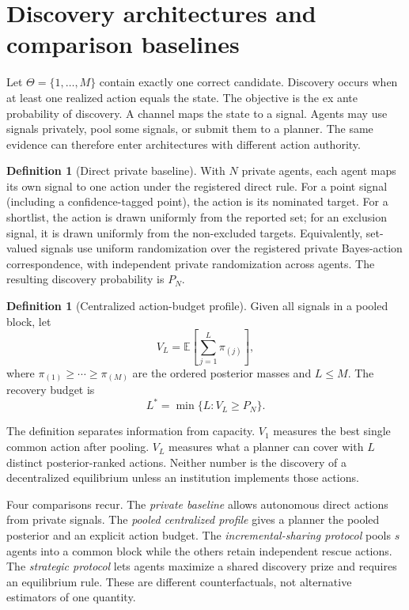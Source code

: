 \documentclass[12pt]{article}
\newcommand{\E}{\mathbb{E}}
\theoremstyle{definition}
\newtheorem{definition}[theorem]{Definition}
\begin{document}
\section{Discovery architectures and comparison baselines}

Let $\Theta=\{1,\ldots,M\}$ contain exactly one correct candidate. Discovery
occurs when at least one realized action equals the state. The objective is the
ex ante probability of discovery. A channel maps the state to a signal. Agents
may use signals privately, pool some signals, or submit them to a planner. The
same evidence can therefore enter architectures with different action authority.

\begin{definition}[Direct private baseline]
With $N$ private agents, each agent maps its own signal to one action under the
registered direct rule. For a point signal (including a confidence-tagged
point), the action is its nominated target. For a shortlist, the action is drawn
uniformly from the reported set; for an exclusion signal, it is drawn uniformly
from the non-excluded targets. Equivalently, set-valued signals use uniform
randomization over the registered private Bayes-action correspondence, with
independent private randomization across agents. The resulting discovery
probability is $P_N$.
\end{definition}

\begin{definition}[Centralized action-budget profile]
Given all signals in a pooled block, let
\[
 V_L=\E\left[\sum_{j=1}^{L}\pi_{(j)}\right],
\]
where $\pi_{(1)}\geq\cdots\geq\pi_{(M)}$ are the ordered posterior masses and
$L\leq M$. The recovery budget is
\[
 L^*=\min\{L:V_L\geq P_N\}.
\]
\end{definition}

The definition separates information from capacity. $V_1$ measures the best
single common action after pooling. $V_L$ measures what a planner can cover with
$L$ distinct posterior-ranked actions. Neither number is the discovery of a
decentralized equilibrium unless an institution implements those actions.



Four comparisons recur. The \emph{private baseline} allows autonomous direct
actions from private signals. The \emph{pooled centralized profile} gives a
planner the pooled posterior and an explicit action budget. The
\emph{incremental-sharing protocol} pools $s$ agents into a common block while
the others retain independent rescue actions. The \emph{strategic protocol}
lets agents maximize a shared discovery prize and requires an equilibrium rule.
These are different counterfactuals, not alternative estimators of one quantity.
\end{document}
